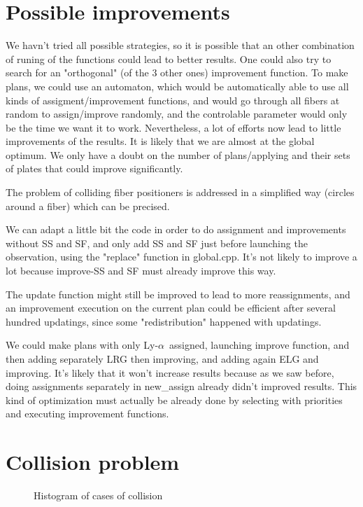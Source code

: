 \documentclass{extarticle}
\def\lya{Ly-$\alpha$\ }
\begin{document}

\section{Possible improvements}
We havn't tried all possible strategies, so it is possible that an other combination of runing of the functions could lead to better results.
One could also try to search for an "orthogonal" (of the 3 other ones) improvement function.
To make plans, we could use an automaton, which would be automatically able to use all kinds of assigment/improvement functions, and would go through all fibers at random to assign/improve randomly, and the controlable parameter would only be the time we want it to work.
Nevertheless, a lot of efforts now lead to little improvements of the results. It is likely that we are almost at the global optimum. We only have a doubt on the number of plans/applying and their sets of plates that could improve significantly.

The problem of colliding fiber positioners is addressed in a simplified way (circles around a fiber) which can be precised.

We can adapt a little bit the code in order to do assignment and improvements without SS and SF, and only add SS and SF just before launching the observation, using the "replace" function in global.cpp. It's not likely to improve a lot because improve-SS and SF must already improve this way.

The update function might still be improved to lead to more reassignments, and an improvement execution on the current plan could be efficient after several hundred updatings, since some "redistribution" happened with updatings.

We could make plans with only \lya assigned, launching improve function, and then adding separately LRG then improving, and adding again ELG and improving. It's likely that it won't increase results because as we saw before, doing assignments separately in new\_assign already didn't improved results. This kind of optimization must actually be already done by selecting with priorities and executing improvement functions.

\section{Collision problem}
\begin{figure}[H]\begin{center}
\caption{Histogram of cases of collision}
\end{center}\end{figure}
\end{document}
